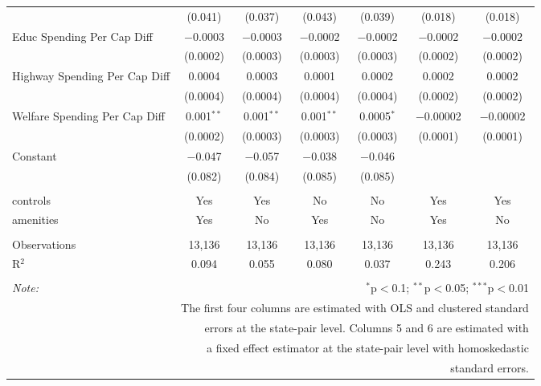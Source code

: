 \begin{table}[!htbp]
\begin{tabular}{@{\extracolsep{5pt}}lcccccc}
  & (0.041) & (0.037) & (0.043) & (0.039) & (0.018) & (0.018) \\ 
  Educ Spending Per Cap Diff & $-$0.0003 & $-$0.0003 & $-$0.0002 & $-$0.0002 & $-$0.0002 & $-$0.0002 \\ 
  & (0.0002) & (0.0003) & (0.0003) & (0.0003) & (0.0002) & (0.0002) \\ 
  Highway Spending Per Cap Diff & 0.0004 & 0.0003 & 0.0001 & 0.0002 & 0.0002 & 0.0002 \\ 
  & (0.0004) & (0.0004) & (0.0004) & (0.0004) & (0.0002) & (0.0002) \\ 
  Welfare Spending Per Cap Diff & 0.001$^{**}$ & 0.001$^{**}$ & 0.001$^{**}$ & 0.0005$^{*}$ & $-$0.00002 & $-$0.00002 \\ 
  & (0.0002) & (0.0003) & (0.0003) & (0.0003) & (0.0001) & (0.0001) \\ 
  Constant & $-$0.047 & $-$0.057 & $-$0.038 & $-$0.046 &  &  \\ 
  & (0.082) & (0.084) & (0.085) & (0.085) &  &  \\ 
 \hline \\[-1.8ex] 
controls & Yes & Yes & No & No & Yes & Yes \\ 
amenities & Yes & No & Yes & No & Yes & No \\ 
\hline \\[-1.8ex] 
Observations & 13,136 & 13,136 & 13,136 & 13,136 & 13,136 & 13,136 \\ 
R$^{2}$ & 0.094 & 0.055 & 0.080 & 0.037 & 0.243 & 0.206 \\ 
\hline 
\hline \\[-1.8ex] 
\textit{Note:}  & \multicolumn{6}{r}{$^{*}$p$<$0.1; $^{**}$p$<$0.05; $^{***}$p$<$0.01} \\ 
 & \multicolumn{6}{r}{The first four columns are estimated with OLS and clustered standard} \\ 
 & \multicolumn{6}{r}{ errors at the state-pair level. Columns 5 and 6 are estimated with} \\ 
 & \multicolumn{6}{r}{a fixed effect estimator at the state-pair level with homoskedastic} \\ 
 & \multicolumn{6}{r}{standard errors.} \\ 
\end{tabular} 
\end{table} 
